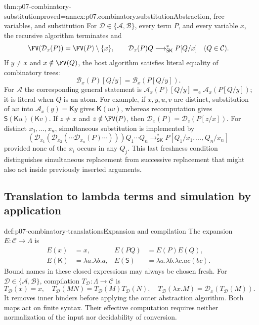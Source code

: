 \begin{hbtheorem}{thm:p07-combinatory-substitution}{proved=annex:p07.combinatory.substitution}{Abstraction, free variables, and substitution}
For \(\mathcal D\in\{\mathcal A,\mathcal B\}\), every term \(P\), and every
variable \(x\), the recursive algorithm terminates and
\[
 \FV(\mathcal D_x(P))=\FV(P)\setminus\{x\},\qquad
 \mathcal D_x(P)Q\longrightarrow_{\mathsf{SK}}^*P[Q/x]
 \quad(Q\in\mathcal C).
\]
If \(y\ne x\) and \(x\notin\FV(Q)\), the host algorithm satisfies literal
equality of combinatory trees:
\[
 \mathcal B_x(P)[Q/y]=\mathcal B_x(P[Q/y]).
\]
For \(\mathcal A\) the corresponding general statement is
\(\mathcal A_x(P)[Q/y]=_{\mathrm e}\mathcal A_x(P[Q/y])\); it is literal
when \(Q\) is an atom.  For example, if \(x,y,u,v\) are distinct, substitution
of \(uv\) into \(\mathcal A_x(y)=\mathsf Ky\) gives \(\mathsf K(uv)\),
whereas recomputation gives \(\mathsf S(\mathsf Ku)(\mathsf Kv)\).
If \(z\ne x\) and \(z\notin\FV(P)\), then
\(\mathcal D_x(P)=\mathcal D_z(P[z/x])\).
For distinct \(x_1,\ldots,x_n\), simultaneous substitution is implemented by
\[
 (\mathcal D_{x_1}(\mathcal D_{x_2}(\cdots
 \mathcal D_{x_n}(P)\cdots)))Q_1\cdots Q_n
 \longrightarrow_{\mathsf{SK}}^*P[Q_1/x_1,\ldots,Q_n/x_n]
\]
provided none of the \(x_i\) occurs in any \(Q_j\).
This last freshness condition distinguishes simultaneous replacement from
successive replacement that might also act inside previously inserted arguments.
\end{hbtheorem}

\subsection{Translation to lambda terms and simulation by application}
\label{sec:p07-combinatory-translations}

\begin{hbdefinition}{def:p07-combinatory-translations}{Expansion and compilation}
The expansion \(E:\mathcal C\to\Lambda\) is
\[
\begin{aligned}
 E(x)&=x,& E(PQ)&=E(P)E(Q),\\
 E(\mathsf K)&=\lambda a.\lambda b.a,&
 E(\mathsf S)&=\lambda a.\lambda b.\lambda c.ac(bc).
\end{aligned}
\]
Bound names in these closed expressions may always be chosen fresh.
For \(\mathcal D\in\{\mathcal A,\mathcal B\}\), compilation
\(T_{\mathcal D}:\Lambda\to\mathcal C\) is
\[
 T_{\mathcal D}(x)=x,\quad
 T_{\mathcal D}(MN)=T_{\mathcal D}(M)T_{\mathcal D}(N),\quad
 T_{\mathcal D}(\lambda x.M)=\mathcal D_x(T_{\mathcal D}(M)).
\]
It removes inner binders before applying the outer abstraction algorithm.
Both maps act on finite syntax.  Their effective computation requires neither
normalization of the input nor decidability of conversion.
\end{hbdefinition}

